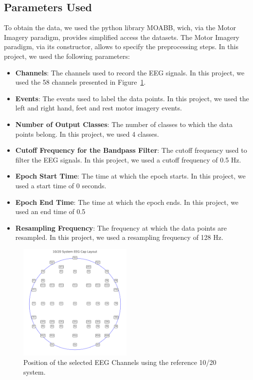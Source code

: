 \subsection*{Parameters Used}
To obtain the data, we used the python library MOABB, wich, via the Motor Imagery paradigm, provides simplified access the datasets.
The Motor Imagery paradigm, via its constructor, allows to specify the preprocessing steps.
In this project, we used the following parameters:
\begin{itemize}
    \item \textbf{Channels}: The channels used to record the EEG signals. In this project, we used the 58 channels presented in Figure~\ref{fig:eeg_channels}.
    \item \textbf{Events}: The events used to label the data points. In this project, we used the left and right hand, feet and rest motor imagery events.
    \item \textbf{Number of Output Classes}: The number of classes to which the data points belong. In this project, we used 4 classes.
    \item \textbf{Cutoff Frequency for the Bandpass Filter}: The cutoff frequency used to filter the EEG signals. In this project, we used a cutoff frequency of 0.5 Hz.
    \item \textbf{Epoch Start Time}: The time at which the epoch starts. In this project, we used a start time of 0 seconds.
    \item \textbf{Epoch End Time}: The time at which the epoch ends. In this project, we used an end time of 0.5
    \item \textbf{Resampling Frequency}: The frequency at which the data points are resampled. In this project, we used a resampling frequency of 128 Hz.
\end{itemize}
\begin{figure}[!htbp]
    \centering
    \includegraphics[width=0.5\textwidth]{Figures/Methodology/thesis_eeg_cap}
    \caption{Position of the selected EEG Channels using the reference 10/20 system.}
    \label{fig:eeg_channels}
\end{figure}

